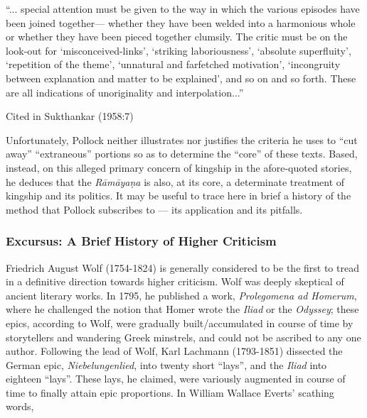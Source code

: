 \begin{myquote}
“... special attention must be given to the way in which the various episodes have been joined together— whether they have been welded into a harmonious whole or whether they have been pieced together clumsily. The critic must be on the look-out for ‘misconceived-links’, ‘striking laboriousness’, ‘absolute superfluity’, ‘repetition of the theme’, ‘unnatural and farfetched motivation’, ‘incongruity between explanation and matter to be explained’, and so on and so forth. These are all indications of unoriginality and interpolation...”	

\hfill Cited in Sukthankar (1958:7)
\end{myquote}

Unfortunately, Pollock neither illustrates nor justifies the criteria he uses to “cut away”  ``extraneous'' portions so as to determine the “core” of these texts. Based, instead, on this alleged primary concern of kingship in the afore-quoted stories, he deduces that the {\sl Rāmāyaṇa} is also, at its core, a determinate treatment of kingship and its politics. It may be useful to trace here in brief a history of the method that Pollock subscribes to --- its application and its pitfalls.\\[-21pt]  

\subsubsection{Excursus: A   Brief History of Higher Criticism}\label{sec1.1.1.1}

Friedrich August Wolf (1754-1824) is generally considered to be the first to tread in a definitive direction towards higher criticism. Wolf was deeply skeptical of ancient literary works. In 1795, he published a work, {\sl Prolegomena ad Homerum}, where he challenged the notion that Homer wrote the {\sl Iliad} or the {\sl Odyssey}; these epics, according to Wolf, were gradually built/accumulated in course of time by storytellers and wandering Greek minstrels, and could not be ascribed to any one author. Following the lead of Wolf, Karl Lachmann (1793-1851) dissected the German epic, {\sl Niebelungenlied}, into twenty short “lays”, and the {\sl Iliad} into eighteen “lays”. These lays, he claimed, were variously augmented in course of time to finally attain epic proportions. In William Wallace Everts’ scathing words, 

